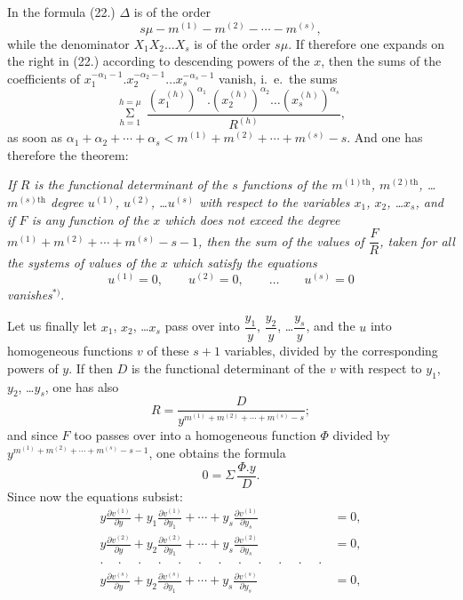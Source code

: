 \documentclass{article}
\begin{document}

In the formula (22.) $\Delta$ is of the order
\[
s\mu-m^{(1)}-m^{(2)}-\cdots-m^{(s)},
\]
while the denominator $X_{1}X_{2}\ldots X_{s}$ is of the order $s\mu$. If therefore one expands on the right in (22.) according to descending powers of the $x$, then the sums of the coefficients of $x_{1}^{-\alpha_{1}-1}.x_{2}^{-\alpha_{2}-1}\ldots x_{s}^{-\alpha_{s}-1}$ vanish, i.\ e.\ the sums
\[
\mathop{\Sigma}\limits_{h=1}^{h=\mu}\,\frac{\left(x_{1}^{(h)}\right)^{\alpha_{1}}.\left(x_{2}^{(h)}\right)^{\alpha_{2}}\ldots\left(x_{s}^{(h)}\right)^{\alpha_{s}}}{R^{(h)}},
\]
as soon as $\alpha_{1}+\alpha_{2}+\cdots+\alpha_{s}<m^{(1)}+m^{(2)}+\cdots+m^{(s)}-s$. And one has therefore the theorem:

\emph{If $R$ is the functional determinant of the $s$ functions of the $m^{(1)\text{th}}$, $m^{(2)\text{th}}$, \ldots $m^{(s)\text{th}}$ degree $u^{(1)}$, $u^{(2)}$, \ldots $u^{(s)}$ with respect to the variables $x_{1}$, $x_{2}$, \ldots $x_{s}$, and if $F$ is any function of the $x$ which does not exceed the degree $m^{(1)}+m^{(2)}+\cdots+m^{(s)}-s-1$, then the sum of the values of $\dfrac{F}{R}$, taken for all the systems of values of the $x$ which satisfy the equations}
\[
u^{(1)}=0,\qquad u^{(2)}=0,\qquad \ldots\qquad u^{(s)}=0
\]
\emph{vanishes}${}^{*)}$.

Let us finally let $x_{1}$, $x_{2}$, \ldots $x_{s}$ pass over into $\dfrac{y_{1}}{y}$, $\dfrac{y_{2}}{y}$, \ldots $\dfrac{y_{s}}{y}$, and the $u$ into homogeneous functions $v$ of these $s+1$ variables, divided by the corresponding powers of $y$. If then $D$ is the functional determinant of the $v$ with respect to $y_{1}$, $y_{2}$, \ldots $y_{s}$, one has also
\[
R = \frac{D}{y^{m^{(1)}+m^{(2)}+\cdots+m^{(s)}-s}};
\]
and since $F$ too passes over into a homogeneous function $\Phi$ divided by $y^{m^{(1)}+m^{(2)}+\cdots+m^{(s)}-s-1}$, one obtains the formula
\[
0 = \Sigma\,\frac{\Phi.y}{D}.
\]
Since now the equations subsist:
\[
\begin{aligned}
y\frac{\partial v^{(1)}}{\partial y}+y_{1}\frac{\partial v^{(1)}}{\partial y_{1}}+\cdots+y_{s}\frac{\partial v^{(1)}}{\partial y_{s}} &= 0,\\
y\frac{\partial v^{(2)}}{\partial y}+y_{2}\frac{\partial v^{(2)}}{\partial y_{1}}+\cdots+y_{s}\frac{\partial v^{(2)}}{\partial y_{s}} &= 0,\\
\cdot\quad\cdot\quad\cdot\quad\cdot\quad\cdot\quad\cdot\quad\cdot\quad\cdot\quad\cdot\quad\cdot\quad\cdot\quad\cdot &\\
y\frac{\partial v^{(s)}}{\partial y}+y_{2}\frac{\partial v^{(s)}}{\partial y_{1}}+\cdots+y_{s}\frac{\partial v^{(s)}}{\partial y_{s}} &= 0,
\end{aligned}
\]
\end{document}
